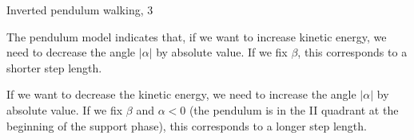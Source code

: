 \documentclass{beamer}
\begin{document}

\begin{frame}{Inverted pendulum walking, 3}
	\begin{flushleft}
		
		The pendulum model indicates that, if we want to increase kinetic energy, we need to decrease the angle $|\alpha|$ by absolute value. If we fix $\beta$, this corresponds to a shorter step length.
		
		\bigskip
		
		If we want to decrease the kinetic energy, we need to increase the angle $|\alpha|$ by absolute value. If we fix $\beta$ and $\alpha < 0$ (the pendulum is in the II quadrant at the beginning of the support phase), this corresponds to a longer step length.
		
	\end{flushleft}
\end{frame}
\end{document}
